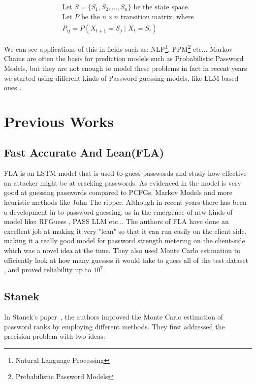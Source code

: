 \documentclass[english,noexaminfo,a4paper,oneside, binding = 0.6cm]{sapthesis}
\begin{document}
 \begin{gather*}
  \text{Let } S = \{S_1, S_2, \dots, S_n\} \text{ be the state space.} \\
  \text{Let } P \text{ be the } n \times n \text{ transition matrix, where} \\
  P_{ij} = P(X_{t+1} = S_j \mid X_t = S_i)
\end{gather*}

We can see applications of this in fields such as: NLP\footnote{Natural Language Processing}, PPM\footnote{Probabilistic Password Models} etc...
Markov Chains are often the basis for prediction models such as Probabilistic Password Models, but they are not enough to model these problems in fact in recent years we started using different kinds of Password-guessing models, like LLM based ones .
\pagebreak




\section{Previous Works}
\subsection{Fast Accurate And Lean(FLA)}
FLA is an LSTM model that is used to guess passwords and study how effective an attacker might be at cracking passwords.
As evidenced in \cite{ref:fla} the model is very good at guessing passwords compared to PCFGs, Markov Models and more heuristic methods like John The ripper.
Although in recent years there has been a development in to password guessing, as in the emergence of new kinds of model like: RFGuess \cite{ref:rfguess}, PASS LLM \cite{ref:pwdguessllm} etc...
The authors of FLA have done an excellent job at making it very "lean" so that it can  run easily on the client side, making it a really good model for password strength metering on the client-side which was a novel idea at the time.
They also used Monte Carlo estimation\cite{ref:dellamico} to efficiently look at how many guesses it would take to guess all of the test dataset \cite{ref:fla}, and proved reliability up to $10^7$.

\subsection{Stanek}
In Stanek's paper~\cite{ref:stanek}, the authors improved the Monte Carlo estimation of password ranks by employing different methods. They first addressed the precision problem with two ideas:
\end{document}
